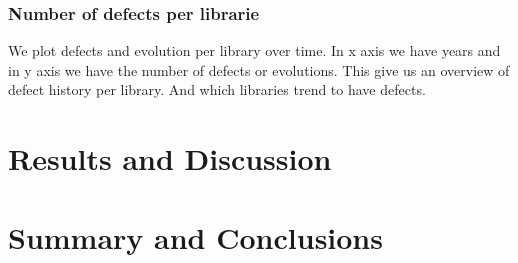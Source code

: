 \documentclass[10pt,conference]{IEEEtran}
\begin{document}
 \subsubsection{Number of defects per librarie}
We plot  defects and evolution per library over time.  In x axis we have years and in y axis  we have the number of defects  or evolutions.  This give us an overview of defect  history per library. And  which libraries   trend to have defects.

 \section{Results and Discussion}\label{sec:results-discussion}


  
\section{Summary and Conclusions}\label{sec:conclusion}

%



\vspace{12pt}
\end{document}

